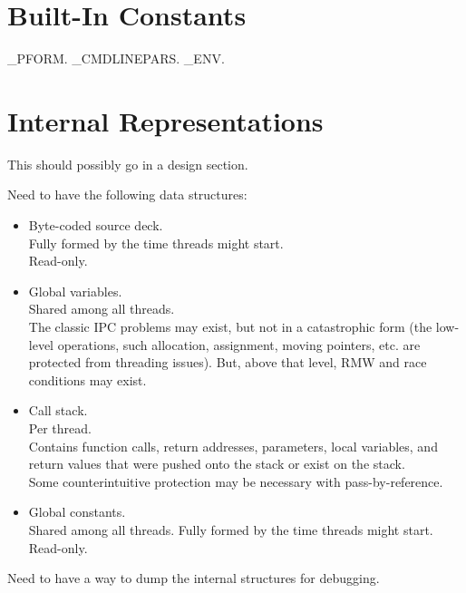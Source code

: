 \section{Built-In Constants}
\label{ccik2:sbic0}

\_PFORM.
\_CMDLINEPARS.
\_ENV.


\section{Internal Representations}
\label{ccik2:sirp0}

This should possibly go in a design section.

Need to have the following data structures:

\begin{itemize}
\item Byte-coded source deck.\\
      Fully formed by the time threads might start.\\
      Read-only.
\item Global variables.\\
      Shared among all threads.\\
      The classic IPC problems may exist, but not in a catastrophic form (the low-level operations,
      such allocation, assignment, moving pointers, etc. are protected from threading issues).  But,
      above that level, RMW and race conditions may exist.
\item Call stack.\\
      Per thread.\\
      Contains function calls, return addresses, parameters, local variables, and return values that were
      pushed onto the stack or exist on the stack.\\
      Some counterintuitive protection may be necessary with pass-by-reference.
\item Global constants.\\
      Shared among all threads.
      Fully formed by the time threads might start.
      Read-only.
\end{itemize}

Need to have a way to dump the internal structures for debugging.


